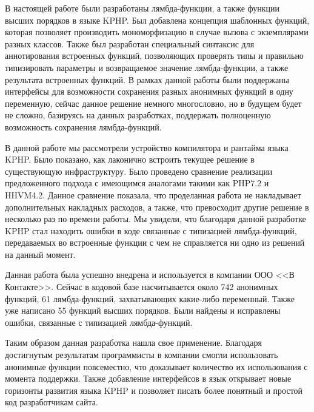 
\startconclusionpage
В настоящей работе были разработаны лямбда-функции, а также функции высших порядков в языке KPHP.
Был добавлена концепция шаблонных функций, которая позволяет производить мономорфизацию в случае вызова с экземплярами разных классов.
Также был разработан специальный синтаксис для аннотирования встроенных функций, позволяющих проверять типы и правильно типизировать параметры и возвращаемое значение лямбда-функции, а также результата встроенных функций.
В рамках данной работы были поддержаны интерфейсы для возможности сохранения разных анонимных функций в одну переменную, сейчас данное решение немного многословно, но в будущем будет не сложно, базируясь на данных разработках, поддержать полноценную возможность сохранения лямбда-функций.

В данной работе мы рассмотрели устройство компилятора и рантайма языка KPHP.
Было показано, как лаконично встроить текущее решение в существующую инфраструктуру.
Было проведено сравнение реализации предложенного подхода с имеющимся аналогами такими как PHP7.2 и HHVM4.2.
Данное сравнение показала, что проделанная работа не накладывает дополнительных накладных расходов, а также, что превосходит другие решение в несколько раз по времени работы.
Мы увидели, что благодаря данной разработке KPHP стал находить ошибки в коде связанные с типизацией лямбда-функций, передаваемых во встроенные функции с чем не справляется ни одно из решений на данный момент.

Данная работа была успешно внедрена и используется в компании ООО <<В Контакте>>.
Сейчас в кодовой базе насчитывается около 742 анонимных функций, 61 лямбда-функций, захватывающих какие-либо переменный.
Также уже написано 55 функций высших порядков.
Были найдены и исправлены ошибки, связанные с типизацией лямбда-функций.

Таким образом данная разработка нашла свое применение.
Благодаря достигнутым результатам программисты в компании смогли использовать анонимные функции повсеместно, что доказывает количество их использования с момента поддержки.
Также добавление интерфейсов в язык открывает новые горизонты развития языка KPHP и позволяет писать более понятный и простой код разработчикам сайта.

\printmainbibliography
